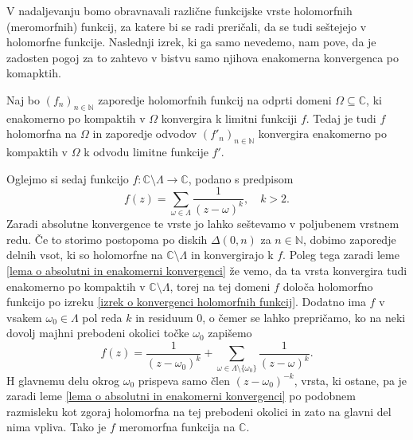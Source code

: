 \documentclass[mat1]{fmfdelo}
\numberwithin{equation}{section}
\newcommand{\N}{\mathbb N}
\newcommand{\C}{\mathbb C}
\newcommand{\om}{\omega}
\newcommand{\disk}[2]{\Delta(#1, #2)}
\theoremstyle{definition}
\begin{document}
V nadaljevanju bomo obravnavali različne funkcijske vrste holomorfnih (meromorfnih) funkcij, za katere bi se radi preričali, da se tudi seštejejo v holomorfne funkcije. Naslednji izrek, ki ga samo nevedemo, nam pove, da je zadosten pogoj za to zahtevo v bistvu samo njihova enakomerna konvergenca po komapktih. 

\begin{izrek}
    \label{izrek o konvergenci holomorfnih funkcij}
    Naj bo $(f_n)_{n \in \N}$ zaporedje holomorfnih funkcij na odprti domeni $\Omega \subseteq \C$, ki enakomerno po kompaktih v $\Omega$ konvergira k limitni funkciji $f$. Tedaj je tudi $f$ holomorfna na $\Omega$ in zaporedje odvodov $(f'_n)_{n\in \N}$ konvergira enakomerno po kompaktih v $\Omega$ k odvodu limitne funkcije $f'$.
\end{izrek}
    
Oglejmo si sedaj funkcijo $f:\C\setminus\Lambda \to \C$, podano s predpisom
\[
    f(z) = \sum_{\om \in \Lambda} \frac{1}{(z - \om)^k}, \quad k > 2.
\]
Zaradi absolutne konvergence te vrste jo lahko seštevamo v poljubenem vrstnem redu. Če to storimo postopoma po diskih $\disk{0}{n}$ za $n\in\N$, dobimo zaporedje delnih vsot, ki so holomorfne na $\C\setminus\Lambda$ in konvergirajo k $f$. Poleg tega zaradi leme \ref{lema o absolutni in enakomerni konvergenci} že vemo, da ta vrsta konvergira tudi enakomerno po kompaktih v $\C\setminus\Lambda$, torej na tej domeni $f$ določa holomorfno funkcijo po izreku \ref{izrek o konvergenci holomorfnih funkcij}. Dodatno ima $f$ v vsakem $\om_0 \in \Lambda$ pol reda $k$ in residuum $0$, o čemer se lahko prepričamo, ko na neki dovolj majhni prebodeni okolici točke $\om_0$ zapišemo
\[
    f(z) = \frac{1}{(z-\om_0)^k} + \sum_{\om \in \Lambda \setminus \{\om_0\}} \frac{1}{(z - \om)^k}.
\]
H glavnemu delu okrog $\om_0$ prispeva samo člen $(z - \om_0)^{-k}$, vrsta, ki ostane, pa je zaradi leme \ref{lema o absolutni in enakomerni konvergenci} po podobnem razmisleku kot zgoraj holomorfna na tej prebodeni okolici in zato na glavni del nima vpliva. Tako je $f$ meromorfna funkcija na $\C$. 
\end{document}
